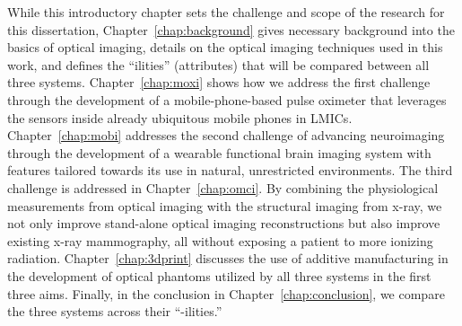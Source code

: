 While this introductory chapter sets the challenge and scope of the research for this dissertation, Chapter~\ref{chap:background} gives necessary background into the basics of optical imaging, details on the optical imaging techniques used in this work, and defines the ``ilities'' (attributes) that will be compared between all three systems. Chapter~\ref{chap:moxi} shows how we address the first challenge through the development of a mobile-phone-based pulse oximeter that leverages the sensors inside already ubiquitous mobile phones in LMICs. Chapter~\ref{chap:mobi} addresses the second challenge of advancing neuroimaging through the development of a wearable functional brain imaging system with features tailored towards its use in natural, unrestricted environments. The third challenge is addressed in Chapter~\ref{chap:omci}. By combining the physiological measurements from optical imaging with the structural imaging from x-ray, we not only improve stand-alone optical imaging reconstructions but also improve existing x-ray mammography, all without exposing a patient to more ionizing radiation. Chapter~\ref{chap:3dprint} discusses the use of additive manufacturing in the development of optical phantoms utilized by all three systems in the first three aims. Finally, in the conclusion in Chapter~\ref{chap:conclusion}, we compare the three systems across their ``-ilities.''


